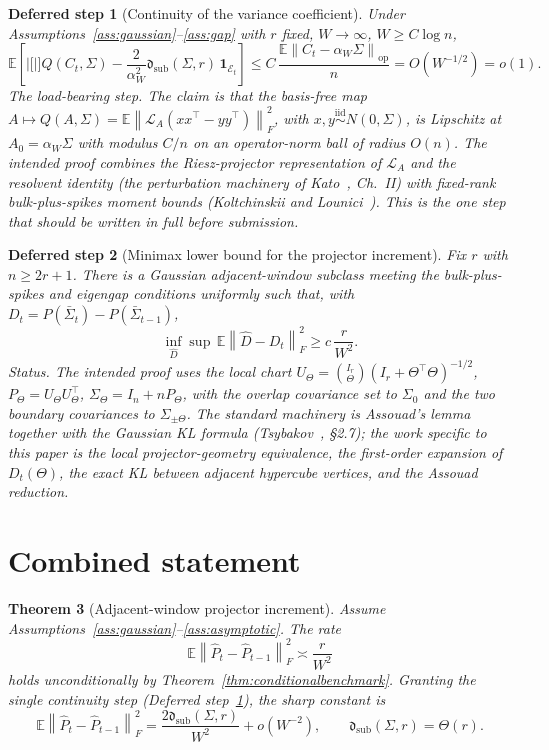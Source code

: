 \documentclass[11pt]{article}
\theoremstyle{tightplain}
\newtheorem{theorem}{Theorem}[section]
\newtheorem{openstep}[theorem]{Deferred step}
\theoremstyle{tightdef}
\DeclareMathOperator{\op}{op}
\newcommand{\E}{\mathbb E}
\newcommand{\norm}[1]{\left\lVert #1 \right\rVert}
\newcommand{\abs}[1]{\left\lvert #1 \right\rvert}
\newcommand{\one}{\mathbf 1}
\newcommand{\Phat}{\widehat P}
\newcommand{\dsub}{\mathfrak d_{\mathrm{sub}}}
\newcommand{\Ecal}{\mathcal E}
\begin{document}
\begin{openstep}[Continuity of the variance coefficient]\label{def:corederivative}
Under Assumptions~\ref{ass:gaussian}--\ref{ass:gap} with $r$ fixed, $W\to\infty$,
$W\ge C\log n$,
\[
\E\left[\abs[\Big]{Q(C_t,\Sigma)-\frac{2}{\alpha_W^2}\dsub(\Sigma,r)}\,\one_{\Ecal_t}\right]
\le C\,\frac{\E\norm{C_t-\alpha_W\Sigma}_{\op}}{n}=O(W^{-1/2})=o(1).
\]
\emph{The load-bearing step.} The claim is that the basis-free map
$A\mapsto Q(A,\Sigma)=\E\norm{\mathcal L_A(xx^\top-yy^\top)}_F^2$, with
$x,y\stackrel{\mathrm{iid}}\sim N(0,\Sigma)$, is Lipschitz at $A_0=\alpha_W\Sigma$ with
modulus $C/n$ on an operator-norm ball of radius $O(n)$. The intended proof combines
the Riesz-projector representation of $\mathcal L_A$ and the resolvent identity (the
perturbation machinery of Kato~\cite{kato}, Ch.~II) with fixed-rank bulk-plus-spikes
moment bounds (Koltchinskii and Lounici~\cite{kl}). This is the one step that should
be written in full before submission.
\end{openstep}

\begin{openstep}[Minimax lower bound for the projector increment]\label{def:rollinglower}
Fix $r$ with $n\ge 2r+1$. There is a Gaussian adjacent-window subclass meeting the
bulk-plus-spikes and eigengap conditions uniformly such that, with
$D_t=P(\bar\Sigma_t)-P(\bar\Sigma_{t-1})$,
\[
\inf_{\widehat D}\sup\,\E\norm{\widehat D-D_t}_F^2\ge c\,\frac r{W^2}.
\]
\emph{Status.} The intended proof uses the local chart
$U_\Theta=\binom{I_r}{\Theta}(I_r+\Theta^\top\Theta)^{-1/2}$,
$P_\Theta=U_\Theta U_\Theta^\top$, $\Sigma_\Theta=I_n+nP_\Theta$, with the overlap
covariance set to $\Sigma_0$ and the two boundary covariances to
$\Sigma_{\pm\Theta}$. The standard machinery is Assouad's lemma together with the
Gaussian KL formula (Tsybakov~\cite{tsybakov}, \S2.7); the work specific to this paper
is the local projector-geometry equivalence, the first-order expansion of
$D_t(\Theta)$, the exact KL between adjacent hypercube vertices, and the Assouad
reduction.
\end{openstep}

\section{Combined statement}

\begin{theorem}[Adjacent-window projector increment]\label{thm:final}
Assume Assumptions~\ref{ass:gaussian}--\ref{ass:asymptotic}. The rate
\[
\E\norm{\Phat_t-\Phat_{t-1}}_F^2\asymp \frac r{W^2}
\]
holds unconditionally by Theorem~\ref{thm:conditionalbenchmark}. Granting the single
continuity step (Deferred step~\ref{def:corederivative}), the sharp constant is
\[
\E\norm{\Phat_t-\Phat_{t-1}}_F^2=\frac{2\dsub(\Sigma,r)}{W^2}+o(W^{-2}),
\qquad \dsub(\Sigma,r)=\Theta(r).
\]
\end{theorem}
\end{document}
